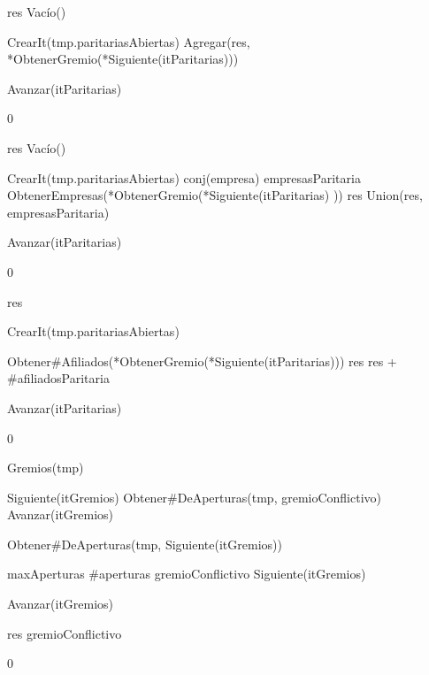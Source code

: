 {
	\state res \asig Vacío()		
	\state

	\state {} \asig CrearIt(tmp.paritariasAbiertas)		
											
		\state
		\state Agregar(res, *ObtenerGremio(*Siguiente(itParitarias)))		
		
		\state
		\state Avanzar(itParitarias)										
	\endwhile
}
{0}

{
	\state res \asig Vacío()		
	\state

	\state {} \asig CrearIt(tmp.paritariasAbiertas)		
							
		\state
		\state conj(empresa) empresasParitaria \asig ObtenerEmpresas(*ObtenerGremio(*Siguiente(itParitarias)		))
		\state res \asig Union(res, empresasParitaria)		

		\state
		\state Avanzar(itParitarias)						
	\endwhile
}
{0}

{
	\state res 		
	\state

	\state {} \asig CrearIt(tmp.paritariasAbiertas)		
						
		\state

		\state {} \asig Obtener\#Afiliados(*ObtenerGremio(*Siguiente(itParitarias)))		
		\state res \asig res + \#afiliadosParitaria		

		\state
		\state Avanzar(itParitarias)					
	\endwhile
}
{0}

{
	\state {} \asig Gremios(tmp)						
	\state

	\state {} \asig Siguiente(itGremios)				
	\state {} \asig Obtener\#DeAperturas(tmp, gremioConflictivo)		
	\state Avanzar(itGremios)																
	\state

																	
		\state

		\state {} \asig Obtener\#DeAperturas(tmp, Siguiente(itGremios))		

									

			\state maxAperturas \asig \#aperturas						
			\state gremioConflictivo \asig Siguiente(itGremios)			
		\endif

		\state
		\state Avanzar(itGremios)										
	\endwhile
	\state

	\state res \asig *gremioConflictivo									
}
{0}

